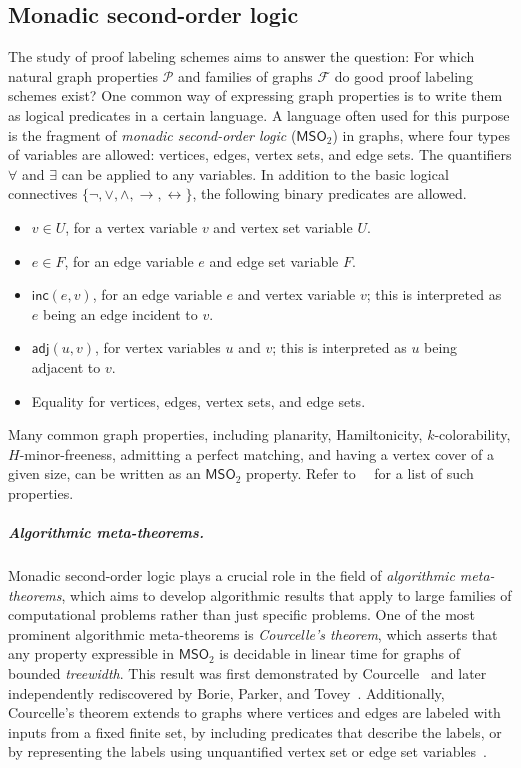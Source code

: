 \documentclass[11pt]{article}
\theoremstyle{definition}
\theoremstyle{remark}
\newcommand{\MSO}{\mathsf{MSO}_2}
\newcommand{\inc}{\mathsf{inc}}
\newcommand{\adj}{\mathsf{adj}}
\begin{document}
 \subsection{Monadic second-order logic}
 The study of proof labeling schemes aims to answer the question: For which natural graph properties $\mathcal{P}$ and families of graphs $\mathcal{F}$ do good proof labeling schemes exist? One common way of expressing graph properties is to write them as logical predicates in a certain language. A language often used for this purpose is the fragment of \emph{monadic second-order logic} ($\MSO$) in graphs, where four types of variables are allowed: vertices, edges, vertex sets, and edge sets. The quantifiers $\forall$ and $\exists$ can be applied to any variables. In addition to the basic logical connectives $\{\neg,\vee,\wedge,\rightarrow,\leftrightarrow\}$, the following binary predicates are allowed.
    \begin{itemize}
    \item $v \in U$, for a vertex variable $v$ and vertex set variable $U$.
    \item $e \in F$, for an edge variable $e$ and edge set variable $F$.
    \item $\inc(e, v)$, for an edge variable $e$ and vertex variable $v$; this is interpreted as $e$ being an edge incident to $v$.
    \item $\adj(u, v)$, for vertex variables $u$ and $v$; this is interpreted as $u$ being adjacent to $v$.
    \item Equality for vertices, edges, vertex sets, and edge sets.
    \end{itemize}

Many common graph properties, including planarity, Hamiltonicity, $k$-colorability, $H$-minor-freeness, admitting a perfect matching, and having a vertex cover of a given size, can be written as an $\MSO$ property. Refer to~\citeauthor{borie1992automatic}~\cite{borie1992automatic} for a list of such properties.

\subparagraph{Algorithmic meta-theorems.}
Monadic second-order logic plays a crucial role in the field of \emph{algorithmic meta-theorems}, which aims to develop algorithmic results that apply to large families of computational problems rather than just specific problems.
One of the most prominent algorithmic meta-theorems is \emph{Courcelle's theorem}, which asserts that any property expressible in $\MSO$ is decidable in linear time for graphs of bounded \emph{treewidth}. This result was first demonstrated by Courcelle~\cite{COURCELLE199012} and later independently rediscovered by Borie, Parker, and Tovey~\cite{borie1992automatic}. Additionally, Courcelle's theorem extends to graphs where vertices and edges are labeled with inputs from a fixed finite set, by including predicates that describe the labels, or by representing the labels using unquantified vertex set or edge set variables~\cite{arnborg1991easy}.
\end{document}
